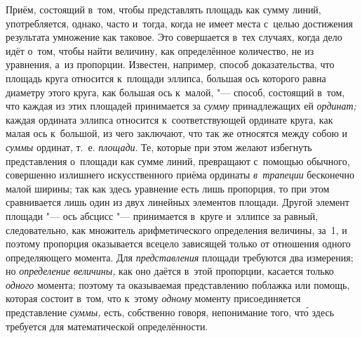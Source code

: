 Приём, состоящий в~том, чтобы представлять площадь как сумму линий,
употребляется, однако, часто и~тогда, когда не имеет места с~целью достижения
результата умножение как таковое. Это совершается в~тех случаях, когда дело
идёт о~том, чтобы найти величину, как определённое количество, не из уравнения,
а~из пропорции. Известен, например, способ доказательства, что площадь круга
относится к~площади эллипса, большая ось которого равна диаметру этого круга,
как большая ось к~малой, "--- способ, состоящий в~том, что каждая из этих
площадей принимается за {\em сумму} принадлежащих ей {\em ординат;} каждая
ордината эллипса относится к~соответствующей ординате круга, как малая ось
к~большой, из чего заключают, что так же относятся между собою и {\em суммы}
ординат, т.~е. {\em площади}. Те, которые при этом желают избегнуть
представления о~площади как сумме линий, превращают с~помощью обычного,
совершенно излишнего искусственного приёма ординаты {\em в~трапеции} бесконечно
малой ширины; так как здесь уравнение есть лишь пропорция, то при этом
сравнивается лишь один из двух линейных элементов площади. Другой элемент
площади "--- ось абсцисс "--- принимается в~круге и~эллипсе за равный,
следовательно, как множитель арифметического определения величины, за~1, и
поэтому пропорция оказывается всецело зависящей только от отношения одного
определяющего момента. Для {\em представления} площади требуются два измерения;
но {\em определение величины,} как оно даётся в~этой пропорции, касается только
{\em одного} момента; поэтому та оказываемая представлению поблажка или помощь,
которая состоит в~том, что к~этому {\em одному} моменту присоединяется
представление {\em суммы,} есть, собственно говоря, непонимание того, чт\'{о} здесь
требуется для математической определённости.

